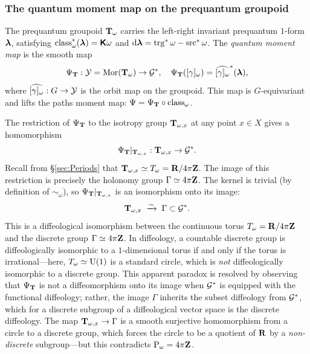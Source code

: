 \documentclass[11pt,reqno,letterpaper,twoside]{amsart}
\renewcommand{\TT}{\Groupoid{T}}
\begin{document}
\subsubsection{The quantum moment map on the prequantum groupoid}

The prequantum groupoid $\TT_{\omega}$ carries the left-right invariant
prequantum $1$-form $\boldsymbol \lambda$, satisfying $\operatorname{class}_{\omega}^{*}(\boldsymbol \lambda) = \boldsymbol{\mathsf{K}}\omega$
and $\mathrm{d}\boldsymbol \lambda = \operatorname{trg}^{*}\omega - \operatorname{src}^{*}\omega$.
The \emph{quantum moment map} is the smooth map
\[
\Psi_{\TT} : \cY = \Mor(\TT_{\omega}) \to \cG^{*},
\quad
\Psi_{\TT}([\gamma]_{\omega}) = \widehat{[\gamma]_{\omega}}^{*}(\blambda),
\]
where $\widehat{[\gamma]_{\omega}} : G \to \mathcal{Y}$ is the orbit map on the groupoid.
This map is $G$-equivariant and lifts the paths moment map:
$\Psi = \Psi_{\TT} \circ \Class_{\omega}$.

The restriction of $\Psi_{\TT}$ to the isotropy group $\TT_{\omega, x}$
at any point $x \in X$ gives a homomorphism
\[
\Psi_{\TT}|_{\TT_{\omega, x}} : \TT_{\omega, x} \to \cG^{*}.
\]
Recall from \S\ref{sec:Periods} that $\TT_{\omega, x} \simeq T_{\omega} = \RR/4\pi\ZZ$.
The image of this restriction is precisely the holonomy group $\Gamma \simeq 4\pi{\mathbf{Z}}$.
The kernel is trivial (by definition of $\sim_{\omega}$), so
$\Psi_{\TT}|_{\TT_{\omega, x}}$ is an isomorphism onto its image:
\[
\TT_{\omega, x} \;\xrightarrow{\sim}\; \Gamma \subset \cG^{*}.
\]
This is a diffeological isomorphism between the continuous torus
$T_{\omega} = {\mathbf{R}}/4\pi{\mathbf{Z}}$ and the discrete group $\Gamma \simeq 4\pi{\mathbf{Z}}$.
In diffeology, a countable discrete group is diffeologically isomorphic
to a $1$-dimensional torus if and only if the torus is irrational---here,
$T_{\omega} \simeq \mathrm{U}(1)$ is a standard circle, which is \emph{not}
diffeologically isomorphic to a discrete group.
This apparent paradox is resolved by observing that $\Psi_{\TT}$ is not
a diffeomorphism onto its image when $\mathcal{G}^{*}$ is equipped with the
functional diffeology; rather, the image $\Gamma$ inherits the subset
diffeology from $\mathcal{G}^{*}$, which for a discrete subgroup of a diffeological
vector space is the discrete diffeology.  The map $\TT_{\omega, x} \to \Gamma$
is a smooth surjective homomorphism from a circle to a discrete group,
which forces the circle to be a quotient of ${\mathbf{R}}$ by a \emph{non-discrete}
subgroup---but this contradicts $\operatorname{P}_\omega = 4\pi{\mathbf{Z}}$.
\end{document}

